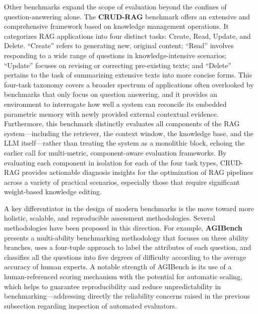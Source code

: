 \documentclass[11pt]{article}
\begin{document}
Other benchmarks expand the scope of evaluation beyond the confines of question-answering alone. The \textbf{CRUD-RAG} benchmark \cite{ref399} offers an extensive and comprehensive framework based on knowledge management operations. It categorizes RAG applications into four distinct tasks: Create, Read, Update, and Delete. ``Create'' refers to generating new, original content; ``Read'' involves responding to a wide range of questions in knowledge-intensive scenarios; ``Update'' focuses on revising or correcting pre-existing texts; and ``Delete'' pertains to the task of summarizing extensive texts into more concise forms. This four-task taxonomy covers a broader spectrum of applications often overlooked by benchmarks that only focus on question answering, and it provides an environment to interrogate how well a system can reconcile its embedded parametric memory with newly provided external contextual evidence. Furthermore, this benchmark distinctly evaluates all components of the RAG system---including the retriever, the context window, the knowledge base, and the LLM itself---rather than treating the system as a monolithic block, echoing the earlier call for multi-metric, component-aware evaluation frameworks. By evaluating each component in isolation for each of the four task types, CRUD-RAG provides actionable diagnosis insights for the optimization of RAG pipelines across a variety of practical scenarios, especially those that require significant weight-based knowledge editing.

A key differentiator in the design of modern benchmarks is the move toward more holistic, scalable, and reproducible assessment methodologies. Several methodologies have been proposed in this direction. For example, \textbf{AGIBench} \cite{ref417} presents a multi-ability benchmarking methodology that focuses on three ability branches, uses a four-tuple approach to label the attributes of each question, and classifies all the questions into five degrees of difficulty according to the average accuracy of human experts. A notable strength of AGIBench is its use of a human-referenced scoring mechanism with the potential for automatic scaling, which helps to guarantee reproducibility and reduce unpredictability in benchmarking---addressing directly the reliability concerns raised in the previous subsection regarding inspection of automated evaluators.
\end{document}
